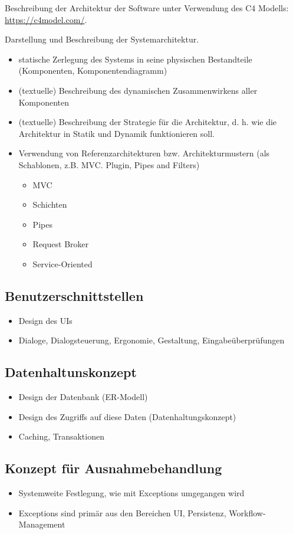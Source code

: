 Beschreibung der Architektur der Software unter Verwendung des C4 Modells: \url{https://c4model.com/}.

Darstellung und Beschreibung der Systemarchitektur.

\begin{itemize}
	\item  statische Zerlegung des Systems in seine physischen Bestandteile (Komponenten, Komponentendiagramm)
	\item (textuelle) Beschreibung des dynamischen Zusammenwirkens aller Komponenten
	\item (textuelle) Beschreibung der Strategie für die Architektur, d. h. wie die Architektur in Statik und Dynamik funktionieren soll.
	\item Verwendung von Referenzarchitekturen bzw. Architekturmustern (als Schablonen, z.B. MVC. Plugin, Pipes and Filters)
	      \begin{itemize}
		      \item MVC
		      \item Schichten
		      \item Pipes
		      \item Request Broker
		      \item Service-Oriented
	      \end{itemize}
\end{itemize}

\subsection{Benutzerschnittstellen}
\begin{itemize}
	\item Design des UIs
	\item Dialoge, Dialogsteuerung, Ergonomie, Gestaltung, Eingabeüberprüfungen
\end{itemize}

\subsection{Datenhaltunskonzept}
\begin{itemize}
	\item Design der Datenbank (ER-Modell)
	\item Design des Zugriffs auf diese Daten (Datenhaltungskonzept)
	\item Caching, Transaktionen
\end{itemize}

\subsection{Konzept für Ausnahmebehandlung}
\begin{itemize}
	\item Systemweite Festlegung, wie mit Exceptions umgegangen wird
	\item Exceptions sind primär aus den Bereichen UI, Persistenz, Workflow-Management
\end{itemize}


